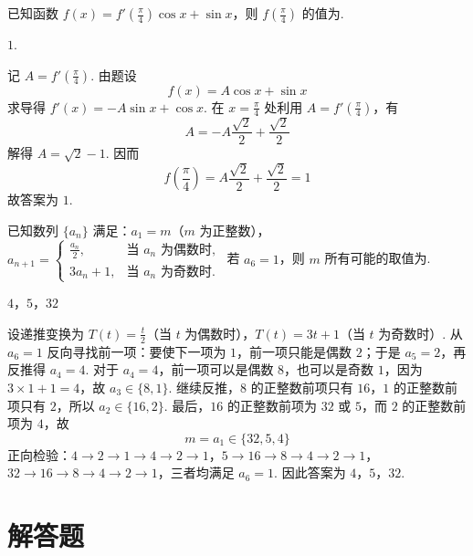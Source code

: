 \begin{problem}
已知函数 \(f(x) = f'\left(\frac{\pi}{4}\right)\cos x + \sin x\)，则 \(f\left(\frac{\pi}{4}\right)\) 的值为\fillinblank{}.
\end{problem}

\begin{answer}
\(1\).
\end{answer}

\begin{solution}
记 \(A=f'\left(\frac\pi4\right)\). 由题设
\[
f(x)=A\cos x+\sin x
\]
求导得 \(f'(x)=-A\sin x+\cos x\). 在 \(x=\frac\pi4\) 处利用 \(A=f'\left(\frac\pi4\right)\)，有
\[
A=-A\frac{\sqrt2}{2}+\frac{\sqrt2}{2}
\]
解得 \(A=\sqrt2-1\). 因而
\[
f\left(\frac\pi4\right)=A\frac{\sqrt2}{2}+\frac{\sqrt2}{2}=1
\]
故答案为 \(1\).
\end{solution}

\begin{problem}
已知数列 \(\{a_{n}\}\) 满足：\(a_1 = m\)（\(m\) 为正整数），\(a_{n+1} = \begin{cases}
\frac{a_n}{2}, & \text{当 } a_n \text{ 为偶数时},\\
3a_n + 1, & \text{当 } a_n \text{ 为奇数时}.
\end{cases}\) 若 \(a_6 = 1\)，则 \(m\) 所有可能的取值为\fillinblank{}.
\end{problem}

\begin{answer}
\(4\)，\(5\)，\(32\)
\end{answer}

\begin{solution}
设递推变换为 \(T(t)=\frac t2\)（当 \(t\) 为偶数时），\(T(t)=3t+1\)（当 \(t\) 为奇数时）. 从 \(a_6=1\) 反向寻找前一项：要使下一项为 \(1\)，前一项只能是偶数 \(2\)；于是 \(a_5=2\)，再反推得 \(a_4=4\). 对于 \(a_4=4\)，前一项可以是偶数 \(8\)，也可以是奇数 \(1\)，因为 \(3\times1+1=4\)，故 \(a_3\in\{8,1\}\). 继续反推，\(8\) 的正整数前项只有 \(16\)，\(1\) 的正整数前项只有 \(2\)，所以 \(a_2\in\{16,2\}\). 最后，\(16\) 的正整数前项为 \(32\) 或 \(5\)，而 \(2\) 的正整数前项为 \(4\)，故
\[
m=a_1\in\{32,5,4\}
\]
正向检验：\(4\to2\to1\to4\to2\to1\)，\(5\to16\to8\to4\to2\to1\)，\(32\to16\to8\to4\to2\to1\)，三者均满足 \(a_6=1\). 因此答案为 \(4\)，\(5\)，\(32\).
\end{solution}

\section{解答题}

